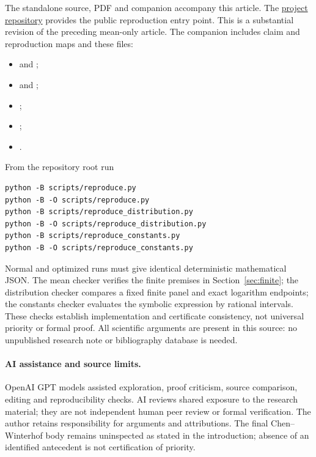 \documentclass[11pt,a4paper]{article}
\numberwithin{equation}{section}
\theoremstyle{remark}
\begin{document}
The standalone source, PDF and companion accompany this article.
The \href{https://github.com/aconsciousfractal/FCIG-Exact-Mean-Bound-for-the-Rational-Complexity-of-Binary-Strings}{project repository}
provides the public reproduction entry point.
This is a substantial revision of the preceding mean-only article.
The companion includes claim and reproduction maps and these files:
\begin{itemize}
\item {} and
;
\item {} and ;
\item {};
\item {};
\item {}.
\end{itemize}
From the repository root run
\begin{verbatim}
python -B scripts/reproduce.py
python -B -O scripts/reproduce.py
python -B scripts/reproduce_distribution.py
python -B -O scripts/reproduce_distribution.py
python -B scripts/reproduce_constants.py
python -B -O scripts/reproduce_constants.py
\end{verbatim}
Normal and optimized runs must give identical deterministic mathematical
JSON. The mean checker verifies the finite premises in
Section~\ref{sec:finite}; the distribution checker compares a fixed
finite panel and exact logarithm endpoints; the constants checker
evaluates the symbolic expression by rational intervals. These checks
establish implementation and certificate consistency, not universal
priority or formal proof. All scientific arguments are present in this
source: no unpublished research note or bibliography database is needed.

\paragraph{AI assistance and source limits.}
OpenAI GPT models assisted exploration, proof criticism, source
comparison, editing and reproducibility checks. AI reviews shared
exposure to the research material; they are not independent human peer
review or formal verification. The author retains responsibility for
arguments and attributions. The final Chen--Winterhof body remains
uninspected as stated in the introduction; absence of an identified
antecedent is not certification of priority.
\appendix
\end{document}
